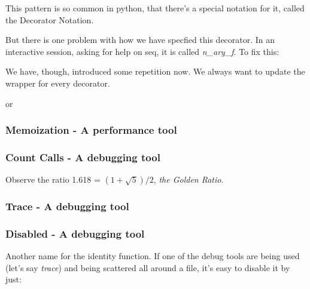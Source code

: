 \documentclass[12pt]{article}
\begin{document}


This pattern is so common in python, that there's a special notation for it, called the Decorator Notation.



But there is one problem with how we have specfied this decorator. In an interactive session, asking for help on seq, it is called \emph{n\_ary\_f}. To fix this:



We have, though, introduced some repetition now. We always want to update the wrapper for every decorator.



or






\subsubsection{Memoization - A performance tool}






\subsubsection{Count Calls - A debugging tool}



Observe the ratio 1.618 = $(1+\sqrt{5})/2$, \emph{the Golden Ratio}.




\subsubsection{Trace - A debugging tool}





\subsubsection{Disabled - A debugging tool}

Another name for the identity function. If one of the debug tools are being used (let's say \emph{trace}) and being scattered all around a file, it's easy to disable it by just:


\end{document}
